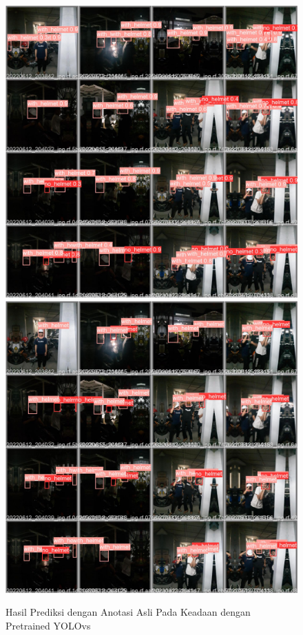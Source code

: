 \begin{figure}[ht]
  \centering
  \includegraphics[scale=0.1]{gambar/train_v2_val/low_ligjt/yolosmall/low_light_val_batch0_pred.jpg}
  \includegraphics[scale=0.1]{gambar/train_v2_val/low_ligjt/yolosmall/lowlight_val_batch0_labels.jpg}
  \caption{Hasil Prediksi dengan Anotasi Asli Pada Keadaan dengan Pretrained YOLOvs}
\end{figure}

